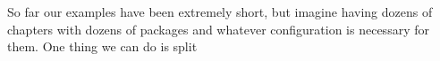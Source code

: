 So far our examples have been extremely short, but imagine having dozens of chapters with dozens of packages and whatever configuration is necessary for them.
One thing we can do is split 